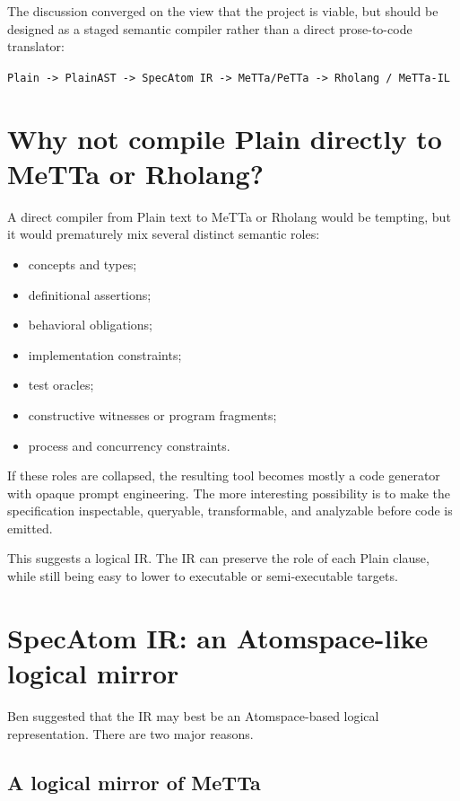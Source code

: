 \documentclass[11pt]{article}
\begin{document}
The discussion converged on the view that the project is viable, but should be
designed as a staged semantic compiler rather than a direct prose-to-code
translator:

\begin{center}
\texttt{Plain -> PlainAST -> SpecAtom IR -> MeTTa/PeTTa -> Rholang / MeTTa-IL}
\end{center}

\section{Why not compile Plain directly to MeTTa or Rholang?}

A direct compiler from Plain text to MeTTa or Rholang would be tempting, but it
would prematurely mix several distinct semantic roles:

\begin{itemize}[nosep]
\item concepts and types;
\item definitional assertions;
\item behavioral obligations;
\item implementation constraints;
\item test oracles;
\item constructive witnesses or program fragments;
\item process and concurrency constraints.
\end{itemize}

If these roles are collapsed, the resulting tool becomes mostly a code generator
with opaque prompt engineering. The more interesting possibility is to make the
specification inspectable, queryable, transformable, and analyzable before code
is emitted.

This suggests a logical IR. The IR can preserve the role of each Plain clause,
while still being easy to lower to executable or semi-executable targets.

\section{SpecAtom IR: an Atomspace-like logical mirror}

Ben suggested that the IR may best be an Atomspace-based logical representation.
There are two major reasons.

\subsection{A logical mirror of MeTTa}
\end{document}
